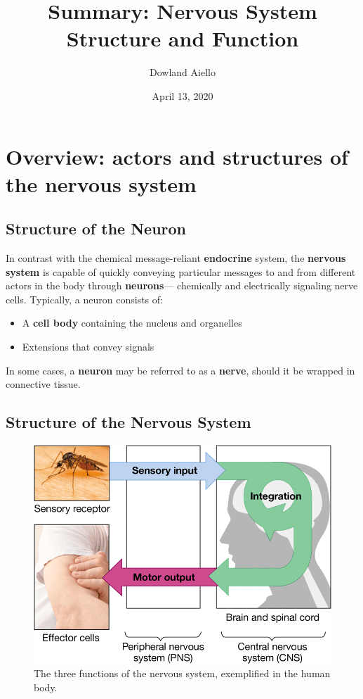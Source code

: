\documentclass{article}
\begin{document}
\title{Summary: Nervous System Structure and Function}
\author{Dowland Aiello}
\date{April 13, 2020}

\maketitle
\tableofcontents
\fancyhf{}

\newpage

\section{Overview: actors and structures of the nervous system}

\subsection{Structure of the Neuron}

In contrast with the chemical message-reliant \textbf{endocrine} system,
the \textbf{nervous system} is capable of quickly conveying particular
messages to and from different actors in the body through \textbf{neurons}---
chemically and electrically signaling nerve cells. Typically, a neuron consists
of:

\begin{itemize}
	\item A \textbf{cell body} containing the nucleus and organelles
	\item Extensions that convey signals
\end{itemize}

In some cases, a \textbf{neuron} may be referred to as a \textbf{nerve}, should
it be wrapped in connective tissue.

\subsection{Structure of the Nervous System}

\begin{figure}
	\centering
	\includegraphics[width=1.0\linewidth]{goals_of_nervous_system.png}
	\caption{The three functions of the nervous system, exemplified in the human body.}
\end{figure}
\end{document}
